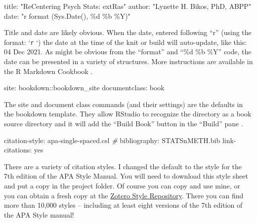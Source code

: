 \documentclass[
]{book}
\newenvironment{Shaded}{\begin{snugshade}}{\end{snugshade}}
\newcommand{\CommentTok}[1]{\textcolor[rgb]{0.56,0.35,0.01}{\textit{#1}}}
\newcommand{\NormalTok}[1]{#1}
\newcommand{\SpecialCharTok}[1]{\textcolor[rgb]{0.00,0.00,0.00}{#1}}
\newcommand{\StringTok}[1]{\textcolor[rgb]{0.31,0.60,0.02}{#1}}
\begin{document}
\begin{Shaded}
\begin{Highlighting}[]
\NormalTok{title}\SpecialCharTok{:} \StringTok{"ReCentering Psych Stats: extRas"}
\NormalTok{author}\SpecialCharTok{:} \StringTok{"Lynette H. Bikos, PhD, ABPP"}
\NormalTok{date}\SpecialCharTok{:} \StringTok{"\textasciigrave{}r format (Sys.Date(), \textquotesingle{}\%d \%b \%Y\textquotesingle{})\textasciigrave{}"}
\end{Highlighting}
\end{Shaded}

Title and date are likely obvious. When the date, entered following ``r'' (using the format: `\texttt{r} `) the date at the time of the knit or build will auto-update, like this: 04 Dec 2021. As might be obvious from the ``format'' and ``\%d \%b \%Y'' code, the date can be presented in a variety of structures. More instructions are available in the R Markdown Cookbook \citep{xie_r_2021}.

\begin{Shaded}
\begin{Highlighting}[]
\NormalTok{site}\SpecialCharTok{:}\NormalTok{ bookdown}\SpecialCharTok{::}\NormalTok{bookdown\_site}
\NormalTok{documentclass}\SpecialCharTok{:}\NormalTok{ book}
\end{Highlighting}
\end{Shaded}

The site and document class commands (and their settings) are the defaults in the bookdown template. They allow RStudio to recognize the directory as a book source directory and it will add the ``Build Book'' button in the ``Build'' pane \citep{xie_54_nodate}.

\begin{Shaded}
\begin{Highlighting}[]
\NormalTok{citation}\SpecialCharTok{{-}}\NormalTok{style}\SpecialCharTok{:}\NormalTok{ apa}\SpecialCharTok{{-}}\NormalTok{single}\SpecialCharTok{{-}}\NormalTok{spaced.csl }\CommentTok{\#}
\NormalTok{bibliography}\SpecialCharTok{:}\NormalTok{ STATSnMETH.bib }
\NormalTok{link}\SpecialCharTok{{-}}\NormalTok{citations}\SpecialCharTok{:}\NormalTok{ yes}
\end{Highlighting}
\end{Shaded}

There are a variety of citation styles. I changed the default to the style for the 7th edition of the APA Style Manual. You will need to download this style sheet and put a copy in the project folder. Of course you can copy and use mine, or you can obtain a fresh copy at the \href{https://www.zotero.org/styles}{Zotero Style Repository}. There you can find more than 10,000 styles -- including at least eight versions of the 7th edition of the APA Style manual!
\end{document}
